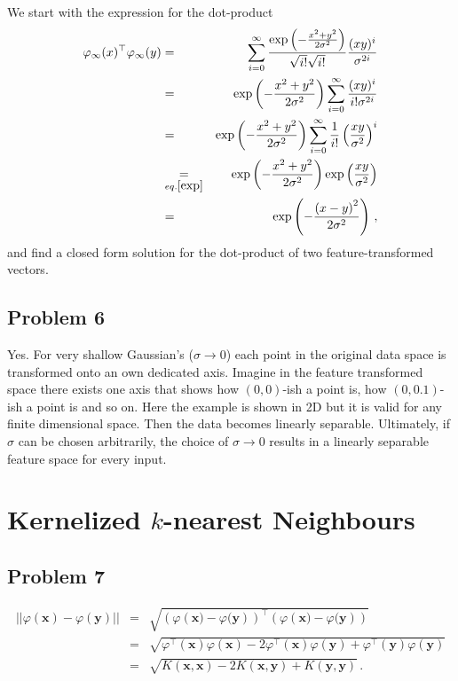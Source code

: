 \documentclass{scrartcl}
\begin{document}
We start with the expression for the dot-product
\begin{eqnarray}
	\varphi_\infty (x)^\top \varphi_\infty (y) &=& \sum\limits_{i=0}^\infty \frac{\exp\left(-\frac{x^2+y^2}{2 \sigma^2}\right)}{\sqrt{i!}\sqrt{i!}} \frac{(xy)^i}{\sigma ^{2i}}\\
	&=& \exp\left(-\frac{x^2+y^2}{2 \sigma^2}\right) \sum\limits_{i=0}^{\infty}\frac{(xy)^i}{i! \sigma^{2i}}\\
	&=& \exp\left(-\frac{x^2+y^2}{2 \sigma^2}\right) \sum\limits_{i=0}^{\infty} \frac{1}{i!}\left(\frac{xy}{\sigma^2}\right)^i\\
	&\underset{eq. \ref{exp}}{=}&  \exp\left(-\frac{x^2+y^2}{2 \sigma^2}\right)\exp\left(\frac{xy}{\sigma^2}\right)\\
	&=& \exp \left(-\frac{\left(x - y\right)^2}{2 \sigma^2}\right) \, ,
\end{eqnarray}
and find a closed form solution for the dot-product of two feature-transformed vectors.

\subsection{Problem 6}
Yes. For very shallow Gaussian's ($\sigma \rightarrow 0$) each point in the original data space is transformed onto an own dedicated axis. Imagine in the feature transformed space there exists one axis that shows how $(0, 0)$-ish a point is, how $(0, 0.1)$-ish a point is and so on. Here the example is shown in 2D but it is valid for any finite dimensional space. Then the data becomes linearly separable. Ultimately, if $\sigma$ can be chosen arbitrarily, the choice of $\sigma \rightarrow 0$ results in a linearly separable feature space for every input.

\section{Kernelized $k$-nearest Neighbours}
\subsection{Problem 7}
\begin{eqnarray}
|| \varphi (\mathbf{x}) - \varphi(\mathbf{y}) || &=& \sqrt{\left(\varphi\left(\mathbf{x}) - \varphi(\mathbf{y}\right)\right)^\top \left(\varphi\left(\mathbf{x}) - \varphi(\mathbf{y}\right)\right)}\\	
&=& \sqrt{\varphi^\top (\mathbf{x})\varphi(\mathbf{x}) - 2\varphi^\top (\mathbf{x}) \varphi(\mathbf{y}) + \varphi^\top(\mathbf{y}) \varphi(\mathbf{y})}\\
&=& \sqrt{K(\mathbf{x}, \mathbf{x}) - 2K(\mathbf{x}, \mathbf{y}) + K(\mathbf{y}, \mathbf{y})} \, .
\end{eqnarray}
\end{document}
